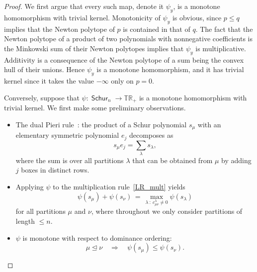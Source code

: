 \documentclass[11pt]{article}
\theoremstyle{definition}
\numberwithin{equation}{section}
\newcommand{\TR}{\mathbb{TR}}
\DeclareMathOperator{\Schur}{\mathsf{Schur}}
\begin{document}
\begin{proof}
	We first argue that every such map, denote it $\psi_y$, is a monotone homomorphism with trivial kernel.
	Monotonicity of $\psi_y$ is obvious, since $p \le q$ implies that the Newton polytope of $p$ is contained in that of $q$.
	The fact that the Newton polytope of a product of two polynomials with nonnegative coefficients is the Minkowski sum of their Newton polytopes implies that $\psi_y$ is multiplicative.
	Additivity is a consequence of the Newton polytope of a sum being the convex hull of their unions.
	Hence $\psi_y$ is a monotone homomorphism, and it has trivial kernel since it takes the value $-\infty$ only on $p = 0$.

	Conversely, suppose that $\psi : \Schur_n \to \TR_+$ is a monotone homomorphism with trivial kernel.
	We first make some preliminary observations.
	\begin{itemize}
		\item The dual Pieri rule~\cite[p.~340]{stanley2}: the product of a Schur polynomial $s_\mu$ with an elementary symmetric polynomial $e_j$ decomposes as
			\begin{equation}
				\label{se_prod}
				s_\mu e_j = \sum_\lambda s_\lambda,
			\end{equation}
			where the sum is over all partitions $\lambda$ that can be obtained from $\mu$ by adding $j$ boxes in distinct rows.
		\item Applying $\psi$ to the multiplication rule~\eqref{LR_mult} yields
			\begin{equation}
				\label{psiadd}
				\psi(s_\mu) + \psi(s_\nu) \,=\, \max_{\lambda \: : \:  c^\lambda_{\mu\nu} \neq 0} \psi(s_\lambda)
			\end{equation}
			for all partitions $\mu$ and $\nu$, where throughout we only consider partitions of length $\le n$.
		\item $\psi$ is monotone with respect to dominance ordering:
			\[
				\mu \trianglelefteq \nu \quad \Longrightarrow \quad \psi(s_\mu) \le \psi(s_\nu).
			\]
			

\end{itemize}
\end{proof}
\end{document}
